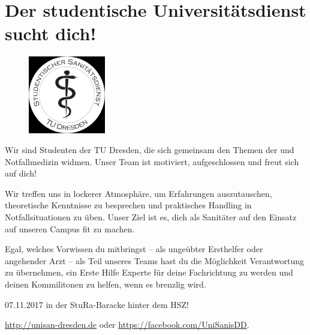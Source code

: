 \section*{\glqq{}Der studentische Universitätsdienst sucht dich!\grqq{}}

\begin{figure}%
  \includegraphics[width=0.3\textwidth]{./unisan-logo-gray.jpg}
\end{figure}
   Wir sind Studenten der TU Dresden, die sich gemeinsam den
    Themen der  und Notfallmedizin widmen. Unser Team ist
motiviert, aufgeschlossen und freut sich auf dich!

 Wir treffen uns in lockerer Atmosphäre, um Erfahrungen
auszutauschen, theoretische Kenntnisse zu besprechen und praktisches
Handling in Notfallsituationen zu üben. Unser Ziel ist es, dich als
Sanitäter auf den Einsatz auf unseren Campus fit zu machen.

   Egal, welches Vorwissen du mitbringst -- als ungeübter
Ersthelfer oder angehender Arzt -- als Teil unseres Teams hast du die
Möglichkeit Verantwortung zu übernehmen, ein Erste Hilfe Experte für
deine Fachrichtung zu werden und deinen Kommilitonen zu helfen, wenn es
brenzlig wird.

 07.11.2017 in der StuRa-Baracke hinter dem HSZ!

 \url{http://unisan-dresden.de} oder \url{https://facebook.com/UniSanisDD}.
